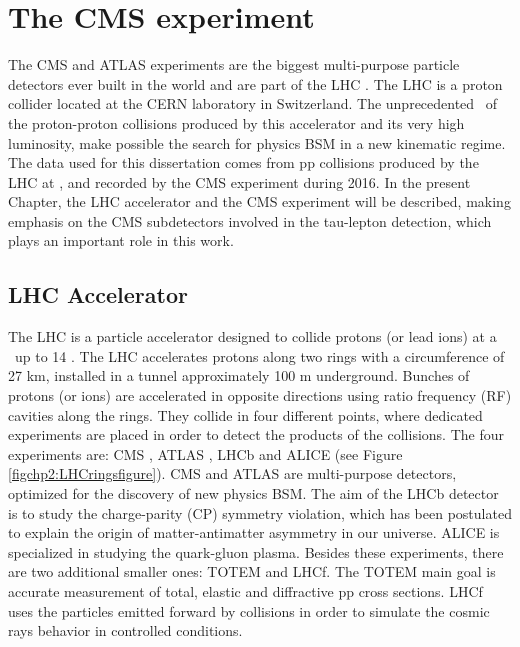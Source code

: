 \chapter[The CMS experiment]{The CMS experiment}
\label{chap:CMSExp}
The CMS and ATLAS experiments are the biggest multi-purpose particle detectors
ever built in the world and  are part of the LHC \cite{chp2:LHCTDR}. The LHC is a 
proton collider located at the CERN laboratory in Switzerland. The 
unprecedented \centermassenergy~of the proton-proton collisions 
produced by this accelerator and its very high luminosity, make possible the search
for physics BSM in a new kinematic regime. The data used for this dissertation comes from
pp collisions produced by the LHC at  \TeV, and recorded by the CMS experiment during 2016.
In the present Chapter, the LHC accelerator and the CMS experiment will be
described, making emphasis on the CMS subdetectors involved in the 
tau-lepton detection, which plays an important role in this work. 


\section{LHC Accelerator}
\label{sec:LHC}
The LHC is a particle accelerator designed to collide protons (or lead ions) at 
a \centermassenergy~up to 14 \TeV. The LHC accelerates protons along 
two rings with a circumference of 27 km, installed in a tunnel 
approximately 100 m underground. Bunches of protons (or ions)
are accelerated in opposite directions using ratio frequency (RF) cavities along the rings. They 
collide in four different points, where dedicated experiments are placed 
in order to detect the products of the collisions. The four experiments
are: CMS \cite{chp2:CMSTDR,chp2:CMSTDR2}, 
ATLAS \cite{chp2:ATLASTDR}, LHCb \cite{chp2:LHCb} and  ALICE \cite{chp2:ALICETDR} (see Figure \ref{figchp2:LHCringsfigure}). CMS 
and ATLAS are multi-purpose detectors, optimized for the discovery of new physics BSM. The aim of the LHCb detector is to study 
the charge-parity (CP) symmetry violation, which has been postulated to explain the origin of matter-antimatter 
asymmetry in our universe. ALICE is specialized in studying the quark-gluon plasma. Besides these experiments, there 
are two additional smaller ones: TOTEM and LHCf. The TOTEM main goal is accurate measurement of total, elastic and diffractive pp
cross sections. LHCf uses the particles emitted forward by collisions in order to simulate
the cosmic rays behavior in controlled conditions. 

